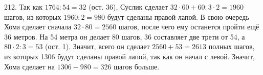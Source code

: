 212. Так как $1764:54=32$ (ост. 36), Суслик сделает $32\cdot60+60:3\cdot2=1960$ шагов, из которых $1960:2=980$ будут сделаны правой лапой. В свою очередь Хома сделает сначала $32\cdot80=2560$ шагов, после чего ему останется пройти ещё 36 метров. На 54 метра он делает 80 шагов, 36 составляет две трети от 54, а  $80\cdot2:3=53$ (ост. 1). Значит, всего он сделает $2560+53=2613$ полных шагов, из которых 1306 будут сделаны правой лапой, так как он начал с левой. Значит, Хома сделает на $1306-980=326$ шагов больше.\\

